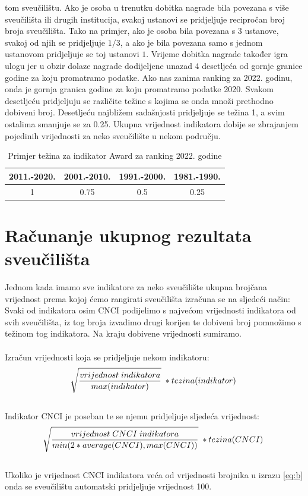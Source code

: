 \documentclass[times, utf8, zavrsni]{fer}
\begin{document}
tom sveučilištu. Ako  je osoba u trenutku dobitka nagrade bila povezana s više sveučilišta ili drugih institucija, svakoj ustanovi se pridjeljuje
recipročan broj broja sveučilišta. Tako na primjer, ako je osoba bila povezana s 3 ustanove, svakoj od njih se pridjeljuje $1/3$, a ako je bila 
povezana samo s jednom ustanovom pridjeljuje se toj ustanovi $1$. 
Vrijeme dobitka nagrade također igra ulogu jer u obzir dolaze nagrade dodijeljene unazad 4 desetljeća od gornje granice godine za koju promatramo podatke.
Ako nas zanima ranking za 2022. godinu, onda je gornja granica godine za koju promatramo podatke 2020. Svakom desetljeću pridjeljuju se različite težine 
s kojima se onda množi prethodno dobiveni broj. Desetljeću najbližem sadašnjosti pridjeljuje se težina 1, a svim ostalima smanjuje se za 0.25.
Ukupna vrijednost indikatora dobije se zbrajanjem pojedinih vrijednosti za neko sveučilište u nekom području.

\begin{table}[htb]
    \caption{Primjer težina za indikator Award za ranking 2022. godine}
        \label{tbl:konstante2}
        \centering
        \begin{tabular}{cccc} \hline
        2011.-2020. & 2001.-2010. & 1991.-2000. & 1981.-1990.\\ \hline
        1&0.75&0.5&0.25\\
        \end{tabular}
        \end{table}    
        \FloatBarrier
\newpage
\section{Računanje ukupnog rezultata sveučilišta}
Jednom kada imamo sve indikatore za neko sveučilište ukupna brojčana vrijednost prema kojoj ćemo rangirati sveučilišta izračuna 
se na sljedeći način:
\\Svaki od indikatora osim CNCI podijelimo s najvećom vrijednosti indikatora od svih sveučilišta, iz tog broja izvadimo 
drugi korijen te dobiveni broj pomnožimo s težinom tog indikatora.
Na kraju dobivene vrijednosti sumiramo.
\\
\\ Izračun vrijednosti koja se pridjeljuje nekom indikatoru: 
\begin{align}
    \sqrt[\leftroot{-2}]{\frac{vrijednost \; indikatora}{max(indikator)}} \; * tezina(indikator) \label{eq:a}
\end{align}
\\ Indikator CNCI je poseban te se njemu pridjeljuje sljedeća vrijednost: \\ 
\begin{align}
    \sqrt[\leftroot{-2}]{\frac{vrijednost \; CNCI \; indikatora}{min(2*average(CNCI), max(CNCI))}} \; * tezina(CNCI) \label{eq:b}
    \end{align}
\\ Ukoliko je vrijednost CNCI indikatora veća od vrijednosti brojnika u izrazu \ref{eq:b} onda se sveučilištu automatski pridjeljuje vrijednost 100.
\end{document}

